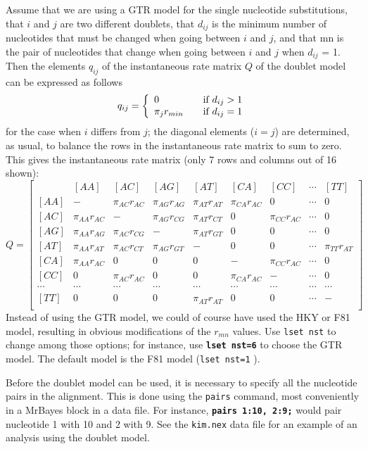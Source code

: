 \documentclass[12pt]{book}
\newcommand{\ttt}[1]{\texttt{#1} }
\newcommand{\tb}[1]{\texttt{\textbf{#1}} }
\begin{document}
Assume that we are using a GTR model for the single nucleotide substitutions, that $i$ and $j$
are two different doublets, that $d_{ij}$ is the minimum number of nucleotides that must be
changed when going between $i$ and $j$, and that mn is the pair of nucleotides that change
when going between $i$ and $j$ when $d_{ij}$ = 1. Then the elements $q_{ij}$ of the instantaneous rate
matrix $Q$ of the doublet model can be expressed as follows
\[
q_{ij} = \left\{ 
\begin{array}{l l}
  0 & \quad \text{if} ~d_{ij}>1 \\
 \pi_j r_{min} & \quad \text{if} ~d_{ij}=1\\
\end{array} \right.
\]
for the case when $i$ differs from $j$; the diagonal elements ($i = j$) are determined, as usual,
to balance the rows in the instantaneous rate matrix to sum to zero. This gives the
instantaneous rate matrix (only 7 rows and columns out of 16 shown):
\[
Q=\begin{bmatrix}
    & [AA] & [AC] & [AG] & [AT] & [CA] & [CC] & \cdots & [TT]\\ 
 [AA]& - & \pi_{AC} r_{AC} & \pi_{AG} r_{AG} & \pi_{AT} r_{AT}& \pi_{CA} r_{AC} & 0 & \cdots & 0\\ 
 [AC]& \pi_{AA} r_{AC} & - & \pi_{AG} r_{CG} & \pi_{AT} r_{CT}& 0 & \pi_{CC} r_{AC} & \cdots & 0\\ 
 [AG]& \pi_{AA} r_{AG} & \pi_{AC} r_{CG} & - & \pi_{AT} r_{GT}& 0 & 0 & \cdots & 0 \\ 
 [AT]& \pi_{AA} r_{AT} & \pi_{AC} r_{CT} & \pi_{AG} r_{GT}& -& 0 & 0 & \cdots &  \pi_{TT} r_{AT}\\
 [CA]& \pi_{AA} r_{AC} & 0 & 0 & 0 & - &  \pi_{CC} r_{AC} & \cdots & 0\\
 [CC]& 0 & \pi_{AC} r_{AC} & 0 & 0 & \pi_{CA} r_{AC} & -  & \cdots & 0\\
 \cdots& \cdots& \cdots& \cdots& \cdots& \cdots& \cdots& \cdots& \cdots\\
 [TT]& 0 & 0 & 0 &\pi_{AT} r_{AT} & 0 & 0 & \cdots & -\\
\end{bmatrix}
\]
Instead of using the GTR model, we could of course have used the HKY or F81 model,
resulting in obvious modifications of the $r_{mn}$ values. Use \ttt{lset nst} to change among
those options; for instance, use \tb{lset nst=6} to choose the GTR model. The default
model is the F81 model (\ttt{lset nst=1}).

Before the doublet model can be used, it is necessary to specify all the nucleotide pairs in
the alignment. This is done using the \ttt{pairs} command, most conveniently in a MrBayes
block in a data file. For instance, \tb{pairs 1:10, 2:9;} would pair nucleotide 1 with 10
and 2 with 9. See the \ttt{kim.nex} data file for an example of an analysis using the doublet
model.
\end{document}
